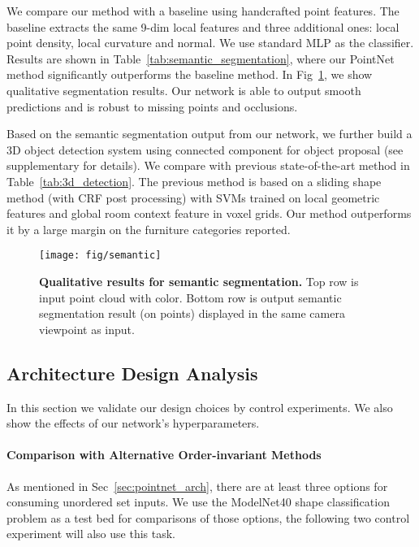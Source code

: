 \documentclass[10pt,twocolumn,letterpaper]{article}
\begin{document}
We compare our method with a baseline using handcrafted point features. The baseline extracts the same 9-dim local features and three additional ones: local point density, local curvature and normal. We use standard MLP as the classifier.  Results are shown in Table~\ref{tab:semantic_segmentation}, where our PointNet method significantly outperforms the baseline method. In Fig~\ref{fig:qualitative_segmentation}, we show qualitative segmentation results. Our network is able to output smooth predictions and is robust to missing points and occlusions.




Based on the semantic segmentation output from our network, we further build a 3D object detection system using connected component for object proposal (see supplementary for details). We compare with previous state-of-the-art method in Table~\ref{tab:3d_detection}. The previous method is based on a sliding shape method (with CRF post processing) with SVMs trained on local geometric features and global room context feature in voxel grids. Our method outperforms it by a large margin on the furniture categories reported.





\begin{figure}[t!]
    \centering
    \texttt{[image: fig/semantic]}
    \caption{\textbf{Qualitative results for semantic segmentation.} Top row is input point cloud with color. Bottom row is output semantic segmentation result (on points) displayed in the same camera viewpoint as input.}
    \label{fig:qualitative_segmentation}
\end{figure}

\subsection{Architecture Design Analysis}
\label{sec:arch_analysis}

In this section we validate our design choices 
by control experiments. We also show the effects of our network's hyperparameters.


\paragraph{Comparison with Alternative Order-invariant Methods} As mentioned in Sec~\ref{sec:pointnet_arch}, there are at least three options for consuming unordered set inputs. We use the ModelNet40 shape classification problem as a test bed for comparisons of those options, the following two control experiment will also use this task. 
\end{document}
